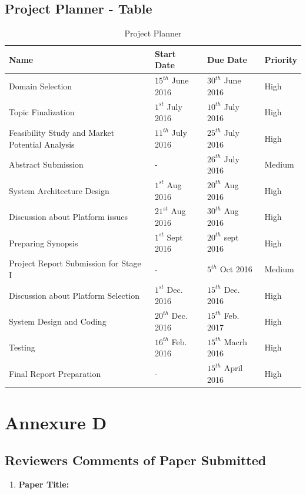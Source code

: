 \documentclass[12pt,a4paper,final]{report}
\DeclareRobustCommand{\gobblefive}[5]{}
\newcommand*{\SkipTocEntry}{\addtocontents{toc}{\gobblefive}}
\begin{document}
{{{{{\SkipTocEntry\section{Project Planner - Table}
\begin{table}[h]
\begin{center}
\begin{tabular}{ |p{5cm}|p{3cm}|p{3cm}|p{1.5cm}| } 
 \hline
 \textbf{Name} & \textbf{Start Date} & \textbf{Due Date} & \textbf{Priority} \\ \hline
  Domain Selection & $15^{th}$ June 2016 & $30^{th}$ June 2016 & High \\ \hline
  Topic Finalization & $1^{st}$ July 2016 & $10^{th}$ July 2016 & High \\ \hline
  Feasibility Study and Market Potential Analysis & $11^{th}$ July 2016 & $25^{th}$ July 2016 & High \\ \hline
  Abstract Submission & - & $26^{th}$ July 2016 & Medium \\ \hline
  System Architecture Design & $1^{st}$ Aug 2016 & $20^{th}$ Aug 2016 & High \\ \hline    
  Discussion about Platform issues & $21^{st}$ Aug 2016 & $30^{th}$ Aug 2016 & High \\ \hline
  Preparing Synopsis & $1^{st}$ Sept 2016 & $20^{th}$ sept 2016 & High \\ \hline
  Project Report Submission for Stage I & - & $5^{th}$ Oct 2016 & Medium \\ \hline
  Discussion about Platform Selection & $1^{st}$ Dec. 2016 & $15^{th}$ Dec. 2016 & High \\ \hline
  System Design and Coding & $20^{th}$ Dec. 2016 & $15^{th}$ Feb. 2017 & High \\ \hline
  Testing & $16^{th}$ Feb. 2016 & $15^{th}$ Macrh 2016 & High \\ \hline
  Final Report Preparation & - & $15^{th}$ April 2016 & High \\ \hline
\end{tabular}
\end{center}
\caption{Project Planner}
\end{table}
\newpage

\SkipTocEntry\chapter{Annexure D}
\thispagestyle{empty}
\newpage
\SkipTocEntry\section{Reviewers Comments of Paper Submitted}
\begin{enumerate}
\item
\textbf{
Paper Title:
}


\end{enumerate}}}}}}
\end{document}
